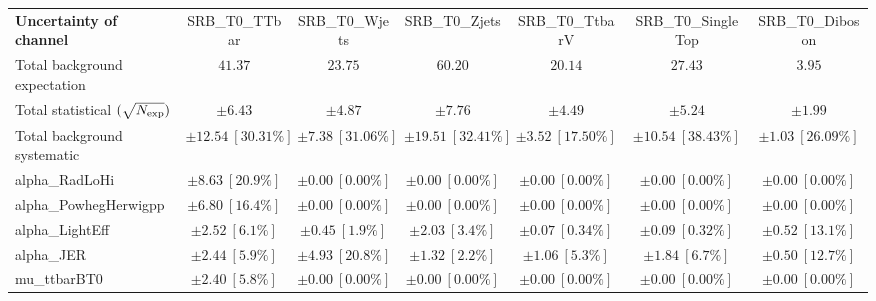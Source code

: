 
\begin{sidewaystable}
\begin{center}
\setlength{\tabcolsep}{0.0pc}
\begin{tabular*}{\textwidth}{@{\extracolsep{\fill}}lcccccc}
\noalign{\smallskip}\hline\noalign{\smallskip}
{\bf Uncertainty of channel}                                    & SRB\_T0\_TTbar            & SRB\_T0\_Wjets            & SRB\_T0\_Zjets            & SRB\_T0\_TtbarV            & SRB\_T0\_SingleTop            & SRB\_T0\_Diboson            \\
\noalign{\smallskip}\hline\noalign{\smallskip}
Total background expectation             &  $41.37$        &  $23.75$        &  $60.20$        &  $20.14$        &  $27.43$        &  $3.95$       \\
\noalign{\smallskip}\hline\noalign{\smallskip}
Total statistical $(\sqrt{N_{\rm exp}})$              & $\pm 6.43$        & $\pm 4.87$        & $\pm 7.76$        & $\pm 4.49$        & $\pm 5.24$        & $\pm 1.99$       \\
Total background systematic               & $\pm 12.54\ [30.31\%] $        & $\pm 7.38\ [31.06\%] $        & $\pm 19.51\ [32.41\%] $        & $\pm 3.52\ [17.50\%] $        & $\pm 10.54\ [38.43\%] $        & $\pm 1.03\ [26.09\%] $             \\
\noalign{\smallskip}\hline\noalign{\smallskip}
\noalign{\smallskip}\hline\noalign{\smallskip}
alpha\_RadLoHi         & $\pm 8.63\ [20.9\%] $          & $\pm 0.00\ [0.00\%] $          & $\pm 0.00\ [0.00\%] $          & $\pm 0.00\ [0.00\%] $          & $\pm 0.00\ [0.00\%] $          & $\pm 0.00\ [0.00\%] $       \\
alpha\_PowhegHerwigpp         & $\pm 6.80\ [16.4\%] $          & $\pm 0.00\ [0.00\%] $          & $\pm 0.00\ [0.00\%] $          & $\pm 0.00\ [0.00\%] $          & $\pm 0.00\ [0.00\%] $          & $\pm 0.00\ [0.00\%] $       \\
alpha\_LightEff         & $\pm 2.52\ [6.1\%] $          & $\pm 0.45\ [1.9\%] $          & $\pm 2.03\ [3.4\%] $          & $\pm 0.07\ [0.34\%] $          & $\pm 0.09\ [0.32\%] $          & $\pm 0.52\ [13.1\%] $       \\
alpha\_JER         & $\pm 2.44\ [5.9\%] $          & $\pm 4.93\ [20.8\%] $          & $\pm 1.32\ [2.2\%] $          & $\pm 1.06\ [5.3\%] $          & $\pm 1.84\ [6.7\%] $          & $\pm 0.50\ [12.7\%] $       \\
mu\_ttbarBT0         & $\pm 2.40\ [5.8\%] $          & $\pm 0.00\ [0.00\%] $          & $\pm 0.00\ [0.00\%] $          & $\pm 0.00\ [0.00\%] $          & $\pm 0.00\ [0.00\%] $          & $\pm 0.00\ [0.00\%] $       \\

\end{tabular*}
\end{center}
\end{sidewaystable}
